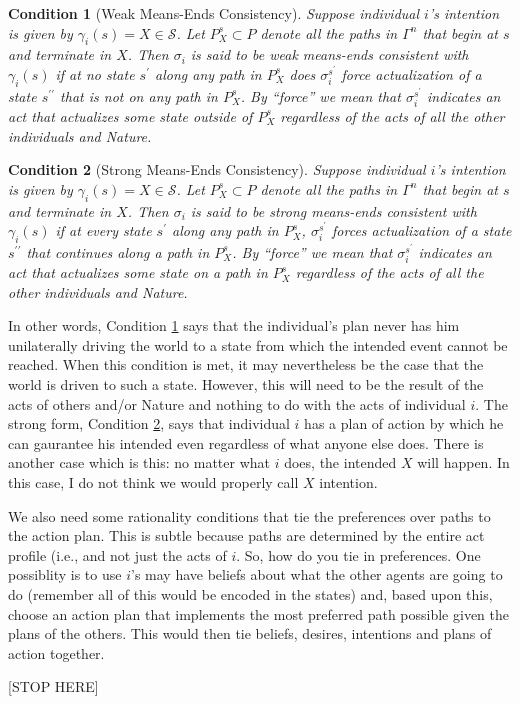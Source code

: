 \documentclass[
11pt,
titlepage,
reqno,
]{article}%
\newtheorem{condition}{Condition}
\theoremstyle{definition}
\begin{document}
	\begin{condition}[Weak Means-Ends Consistency]\label{cond:weak M-E}
		Suppose individual $i$'s intention is given by $\gamma_i(s)=X\in\mathcal{S}$. 
		Let $P^s_X\subset P$ denote all the paths in $\Gamma^n$ that begin at $s$ and terminate in $X$. 
		Then $\sigma_i$ is said to be \textit{weak means-ends consistent with $\gamma_i(s)$} if at no state $s^\prime$ along any path in $P^s_X$ does $\sigma_i^{s^\prime}$ force actualization of a state $s^{\prime\prime}$ that is not on any path in $P^s_X$. 
		By ``force'' we mean that $\sigma_i^{s^\prime}$ indicates an act that actualizes some state outside of $P^s_X$ regardless of the acts of all the other individuals and Nature. 
	\end{condition}
	
	\begin{condition}[Strong Means-Ends Consistency]\label{cond:strong M-E}
		Suppose individual $i$'s intention is given by $\gamma_i(s)=X\in\mathcal{S}$. 
		Let $P^s_X\subset P$ denote all the paths in $\Gamma^n$ that begin at $s$ and terminate in $X$. 
		Then $\sigma_i$ is said to be \textit{strong means-ends consistent with $\gamma_i(s)$} if at every state $s^\prime$ along any path in $P^s_X$,  $\sigma_i^{s^\prime}$ forces actualization of a state $s^{\prime\prime}$ that continues along a path in $P^s_X$. 
		By ``force'' we mean that $\sigma_i^{s^\prime}$ indicates an act that actualizes some state on a path in $P^s_X$ regardless of the acts of all the other individuals and Nature. 
	\end{condition}
	
	In other words, Condition \ref{cond:weak M-E} says that the individual's plan never has him unilaterally driving the world to a state from which the intended event cannot be reached. 
	When this condition is met, it may nevertheless be the case that the world is driven to such a state. 
	However, this will need to be the result of the acts of others and/or Nature and nothing to do with the acts of individual $i$. 
	The strong form, Condition \ref{cond:strong M-E}, says that individual $i$ has a plan of action by which he can gaurantee his intended even regardless of what anyone else does.
	There is another case which is this: no matter what $i$ does, the intended $X$ will happen. 
	In this case, I do not think we would properly call $X$ intention. 
	
	We also need some rationality conditions that tie the preferences over paths to the action plan. 
	This is subtle because paths are determined by the entire act profile (i.e., and not just the acts of $i$. 
	So, how do you tie in preferences. One possiblity is to use $i$'s may have beliefs about what the other agents are going to do (remember all of this would be encoded in the states) and, based upon this, choose an action plan that implements the most preferred path possible given the plans of the others. 
	This would then tie beliefs, desires, intentions and plans of action together. 
	
	
	[STOP HERE]
	


\end{document}
